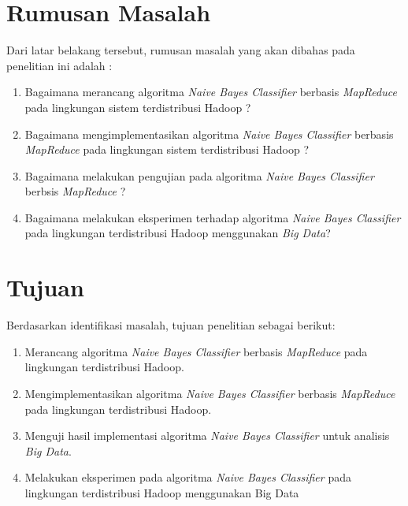 \section{Rumusan Masalah}
Dari latar belakang tersebut, rumusan masalah yang akan dibahas pada penelitian ini adalah :
\begin{enumerate}
	\item Bagaimana merancang algoritma {\it Naive Bayes Classifier} berbasis \textit{MapReduce} pada lingkungan sistem terdistribusi Hadoop ?
	\item Bagaimana mengimplementasikan algoritma {\it Naive Bayes Classifier} berbasis \textit{MapReduce} pada lingkungan sistem terdistribusi Hadoop ?
	\item Bagaimana melakukan pengujian pada algoritma \textit{Naive Bayes Classifier} berbsis \textit{MapReduce} ?	
	\item Bagaimana melakukan eksperimen terhadap algoritma \textit{Naive Bayes Classifier} pada lingkungan terdistribusi Hadoop menggunakan \textit{Big Data}?
\end{enumerate}

\section{Tujuan}
Berdasarkan identifikasi masalah, tujuan penelitian sebagai berikut:
\begin{enumerate}
	\item Merancang algoritma \textit{Naive Bayes Classifier} berbasis \textit{MapReduce} pada lingkungan terdistribusi Hadoop.
	\item Mengimplementasikan algoritma \textit{Naive Bayes Classifier} berbasis \textit{MapReduce} pada lingkungan terdistribusi Hadoop.
	\item Menguji hasil implementasi algoritma \textit{Naive Bayes Classifier} untuk analisis \textit{Big Data}.
	\item Melakukan eksperimen pada algoritma \textit{Naive Bayes Classifier} pada lingkungan terdistribusi Hadoop menggunakan Big Data
\end{enumerate}

